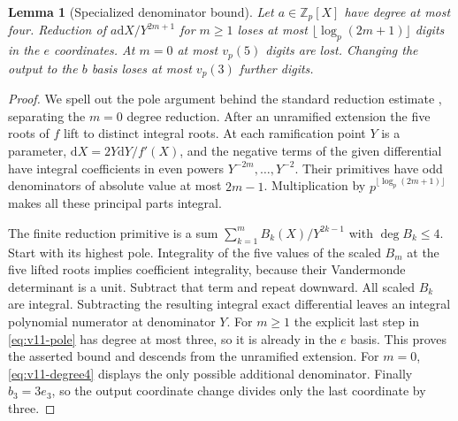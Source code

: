 \documentclass[11pt]{article}
\newtheorem{lemma}[lemma]{Lemma}
\theoremstyle{definition}
\theoremstyle{remark}
\newcommand{\Z}{\mathbb Z}
\newcommand{\dd}{\mathrm d}
\begin{document}
\begin{lemma}[Specialized denominator bound]
\label{lem:v11-denominator}
Let $a\in\Z_p[X]$ have degree at most four. Reduction of
$a\dd X/Y^{2m+1}$ for $m\ge1$ loses at most
$\lfloor\log_p(2m+1)\rfloor$ digits in the $e$ coordinates.
At $m=0$ at most $v_p(5)$ digits are lost. Changing the output to the
$b$ basis loses at most $v_p(3)$ further digits.
\end{lemma}
\begin{proof}
We spell out the pole argument behind the standard reduction estimate
\cite[Lemma 2]{KedlayaMW}, separating the $m=0$ degree reduction.
After an unramified extension the five roots of $f$ lift to distinct
integral roots. At each ramification point $Y$ is a parameter,
$\dd X=2Y\dd Y/f'(X)$, and the negative terms of the given differential
have integral coefficients in even powers $Y^{-2m},\ldots,Y^{-2}$.
Their primitives have odd denominators of absolute value at most
$2m-1$. Multiplication by
$p^{\lfloor\log_p(2m+1)\rfloor}$ makes all these principal parts
integral.

The finite reduction primitive is a sum
$\sum_{k=1}^m B_k(X)/Y^{2k-1}$ with $\deg B_k\le4$.
Start with its highest pole. Integrality of the five values of the
scaled $B_m$ at the five lifted roots implies coefficient integrality,
because their Vandermonde determinant is a unit. Subtract that term and
repeat downward. All scaled $B_k$ are integral. Subtracting the resulting
integral exact differential leaves an integral polynomial numerator at
denominator $Y$. For $m\ge1$ the explicit last step in
\cref{eq:v11-pole} has degree at most three, so it is already in the
$e$ basis. This proves the asserted bound and descends from the
unramified extension. For $m=0$, \cref{eq:v11-degree4} displays the
only possible additional denominator. Finally $b_3=3e_3$, so the output
coordinate change divides only the last coordinate by three.
\end{proof}
\end{document}

